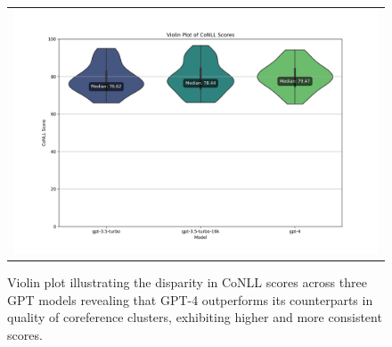 \begin{figure}[ht]
  \centering
  \begin{tabular}{c}
  \includegraphics[width=14cm]{images/conll-score.png}
  \end{tabular}
  \caption[Distribution of CoNLL Score]{Violin plot illustrating the disparity in CoNLL scores across three GPT models revealing that GPT-4 outperforms its counterparts in quality of coreference clusters, exhibiting higher and more consistent scores.}\label{fig:violin-conll}
\end{figure}

